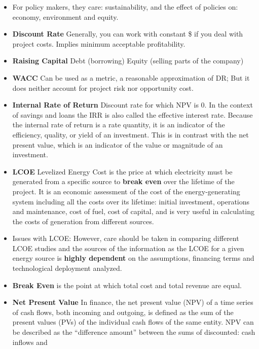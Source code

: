 \documentclass[twocolumn]{article}
\begin{document}
\begin{itemize}
\item For policy makers, they care: sustainability, and the effect of
  policies on: economy, environment and equity.
\item \textbf{Discount Rate} Generally, you can work with constant \$ if you deal with
  project costs. Implies minimum acceptable profitability.
\item \textbf{Raising Capital} Debt (borrowing) Equity (selling parts
  of the company)
\item \textbf{WACC} Can be used as a metric, a reasonable
  approximation of DR; But it does neither account for project risk
  nor opportunity cost.
\item \textbf{Internal Rate of Return} Discount rate for which NPV is
  $0$. In the context of savings and loans the IRR is also called the
  effective interest rate. Because the internal rate of return is a
  rate quantity, it is an indicator of the efficiency, quality, or
  yield of an investment. This is in contrast with the net present
  value, which is an indicator of the value or magnitude of an
  investment. 
\item \textbf{LCOE} Levelized Energy Cost is the price at which
  electricity must be generated from a specific source to \textbf{break even}
  over the lifetime of the project. It is an economic assessment of
  the cost of the energy-generating system including all the costs
  over its lifetime: initial investment, operations and maintenance,
  cost of fuel, cost of capital, and is very useful in calculating the
  costs of generation from different sources.
\item Issues with LCOE: However, care should be taken in comparing
  different LCOE studies and the sources of the information as the
  LCOE for a given energy source is \textbf{highly dependent} on the
  assumptions, financing terms and technological deployment analyzed.
\item \textbf{Break Even} is the point at which total cost and total
  revenue are equal.
\item \textbf{Net Present Value} In finance, the net present value
  (NPV) of a time series of cash flows, both incoming and outgoing, is
  defined as the sum of the present values (PVs) of the individual
  cash flows of the same entity. NPV can be described as the
  “difference amount” between the sums of discounted: cash inflows and

\end{itemize}
\end{document}
